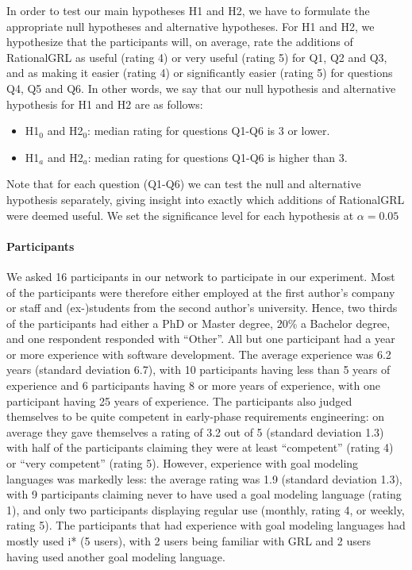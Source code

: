 In order to test our main hypotheses H1 and H2, we have to formulate the appropriate null hypotheses and alternative hypotheses. For H1 and H2, we hypothesize that the participants will, on average, rate the additions of RationalGRL as useful (rating 4) or very useful (rating 5) for Q1, Q2 and Q3, and as making it easier (rating 4) or significantly easier (rating 5) for questions Q4, Q5 and Q6. In other words, we say that our null hypothesis and alternative hypothesis for H1 and H2 are as follows:
\begin{itemize}
\item H1$_{0}$ and H2$_{0}$: median rating for questions Q1-Q6 is 3 or lower.
\item H1$_{a}$ and H2$_{a}$: median rating for questions Q1-Q6 is higher than 3.
\end{itemize}
Note that for each question (Q1-Q6) we can test the null and alternative hypothesis separately, giving insight into exactly which additions of RationalGRL were deemed useful. We set the significance level for each hypothesis at $\alpha = 0.05$

\paragraph{Participants}
We asked 16 participants in our network to participate in our experiment. Most of the participants were therefore either employed at the first author's company or staff and (ex-)students from the second author's university. Hence, two thirds of the participants had either a PhD or Master degree, 20\% a Bachelor degree, and one respondent responded with ``Other''. All but one participant had a year or more experience with software development. The average experience was 6.2 years (standard deviation 6.7), with 10 participants having less than 5 years of experience and 6 participants having 8 or more years of experience, with one participant having 25 years of experience. The participants also judged themselves to be quite competent in  early-phase requirements engineering: on average they gave themselves a rating of 3.2 out of 5 (standard deviation 1.3) with half of the participants claiming they were at least ``competent'' (rating 4) or ``very competent'' (rating 5). However, experience with goal modeling languages was markedly less: the average rating was 1.9 (standard deviation 1.3), with 9 participants claiming never to have used a goal modeling language (rating 1), and only two participants displaying regular use (monthly, rating 4, or weekly, rating 5). The participants that had experience with goal modeling languages had mostly used i* (5 users), with 2 users being familiar with GRL and 2 users having used another goal modeling language.


